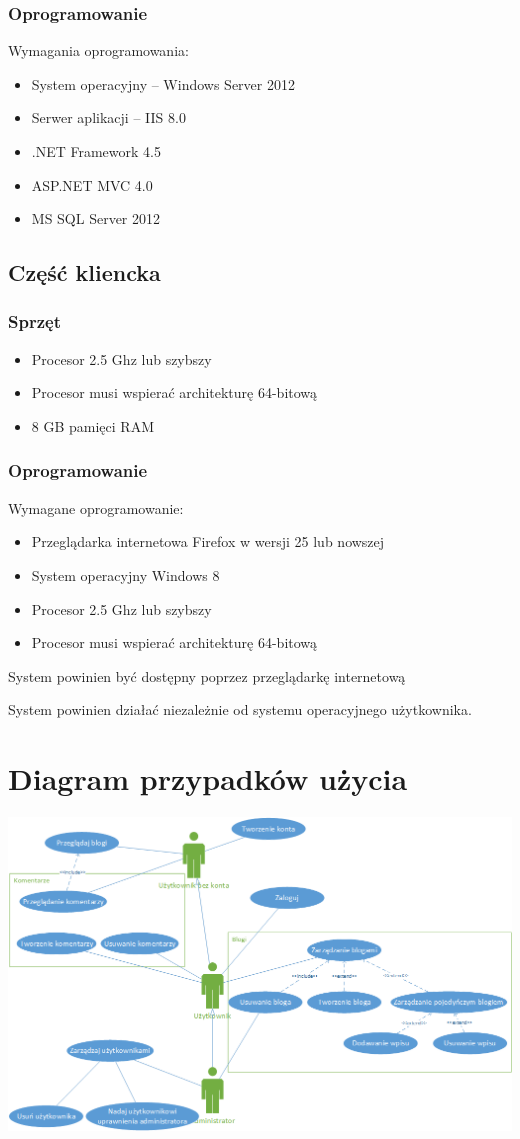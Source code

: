 \documentclass{article}
\begin{document}
\subsubsection{Oprogramowanie}
Wymagania oprogramowania:
\begin{itemize}
\item System operacyjny -- Windows Server 2012 
\item Serwer aplikacji -- IIS 8.0
\item .NET Framework 4.5
\item ASP.NET MVC 4.0
\item MS SQL Server 2012
\end{itemize}


\subsection{Część kliencka}
\subsubsection{Sprzęt}
\begin{itemize}
\item Procesor 2.5 Ghz lub szybszy
\item Procesor musi wspierać architekturę 64-bitową
\item 8 GB pamięci RAM
\end{itemize}
\subsubsection{Oprogramowanie}
Wymagane oprogramowanie:
\begin{itemize}
\item Przeglądarka internetowa Firefox w wersji 25 lub nowszej
\item System operacyjny Windows 8
\item Procesor 2.5 Ghz lub szybszy
\item Procesor musi wspierać architekturę 64-bitową
\end{itemize}
System powinien być dostępny poprzez przeglądarkę internetową 

System powinien działać niezależnie od systemu operacyjnego użytkownika.

\section{Diagram przypadków użycia}
\includegraphics[width=\textwidth]{UseCaseDiagram}
\end{document}
